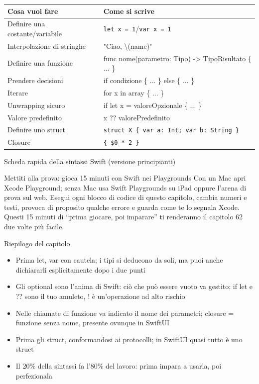 \begin{center}
\begin{tabularx}{\linewidth}{|X|X|}
\hline
\textbf{Cosa vuoi fare} & \textbf{Come si scrive} \tabularnewline
\hline
Definire una costante/variabile & \texttt{let x = 1}/\texttt{var x = 1} \tabularnewline
Interpolazione di stringhe & "Ciao, \textbackslash{}(name)" \tabularnewline
Definire una funzione & func nome(parametro: Tipo) -> TipoRisultato \{ ... \} \tabularnewline
Prendere decisioni & if condizione \{ ... \} else \{ ... \} \tabularnewline
Iterare & for x in array \{ ... \} \tabularnewline
Unwrapping sicuro & if let x = valoreOpzionale \{ ... \} \tabularnewline
Valore predefinito & x ?? valorePredefinito \tabularnewline
Definire uno struct & \texttt{struct X \{ var a: Int; var b: String \}} \tabularnewline
Closure & \texttt{\{ \$0 * 2 \}} \tabularnewline
\hline
\end{tabularx}
\end{center}

\begin{center}\small\color{gray}Scheda rapida della sintassi Swift (versione principianti)\end{center}

\begin{tcbpractice}{Mettiti alla prova: gioca 15 minuti con Swift nei Playgrounds}
Con un Mac apri Xcode Playground; senza Mac usa Swift Playgrounds su iPad oppure l'arena di prova sul web. Esegui ogni blocco di codice di questo capitolo, cambia numeri e testi, provoca di proposito qualche errore e guarda come te lo segnala Xcode. Questi 15 minuti di “prima giocare, poi imparare” ti renderanno il capitolo 62 due volte più facile.

\end{tcbpractice}

\begin{tcbsummary}{Riepilogo del capitolo}
\begin{itemize}
  \item Prima let, var con cautela; i tipi si deducono da soli, ma puoi anche dichiararli esplicitamente dopo i due punti
  \item Gli optional sono l'anima di Swift: ciò che può essere vuoto va gestito; if let e ?? sono il tuo amuleto, ! è un'operazione ad alto rischio
  \item Nelle chiamate di funzione va indicato il nome dei parametri; closure = funzione senza nome, presente ovunque in SwiftUI
  \item Prima gli struct, conformandosi ai protocolli; in SwiftUI quasi tutto è uno struct
  \item Il 20\% della sintassi fa l'80\% del lavoro: prima impara a usarla, poi perfezionala
\end{itemize}

\end{tcbsummary}
